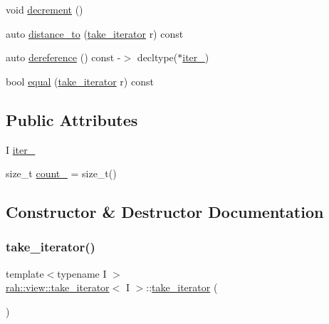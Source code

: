 \begin{DoxyCompactItemize}
\item 
void \mbox{\hyperlink{structrah_1_1view_1_1take__iterator_a8f956fdfee282abbd88100533033d648}{decrement}} ()
\item 
auto \mbox{\hyperlink{structrah_1_1view_1_1take__iterator_a6516d99883863b621df6717bf1d4613b}{distance\+\_\+to}} (\mbox{\hyperlink{structrah_1_1view_1_1take__iterator}{take\+\_\+iterator}} r) const
\item 
auto \mbox{\hyperlink{structrah_1_1view_1_1take__iterator_af6fe7bae848e71f68dcdf12565db2c52}{dereference}} () const -\/$>$ decltype($\ast$\mbox{\hyperlink{structrah_1_1view_1_1take__iterator_abbc947797abfa6ecaeb91c8185212152}{iter\+\_\+}})
\item 
bool \mbox{\hyperlink{structrah_1_1view_1_1take__iterator_a222e31de32a4780e1f0f0f6d9d963ded}{equal}} (\mbox{\hyperlink{structrah_1_1view_1_1take__iterator}{take\+\_\+iterator}} r) const
\end{DoxyCompactItemize}
\subsection*{Public Attributes}
\begin{DoxyCompactItemize}
\item 
I \mbox{\hyperlink{structrah_1_1view_1_1take__iterator_abbc947797abfa6ecaeb91c8185212152}{iter\+\_\+}}
\item 
size\+\_\+t \mbox{\hyperlink{structrah_1_1view_1_1take__iterator_a7d7c6fd1c6eed6192f1f51da04d5ede1}{count\+\_\+}} = size\+\_\+t()
\end{DoxyCompactItemize}


\subsection{Constructor \& Destructor Documentation}
\mbox{\label{structrah_1_1view_1_1take__iterator_a0df2b333ea2a0deb3db7c84d12ebbaca}} 
\subsubsection{\texorpdfstring{take\_iterator()}{take\_iterator()}\hspace{0.1cm}{\footnotesize\ttfamily [1/4]}}
{\footnotesize\ttfamily template$<$typename I $>$ \\
\mbox{\hyperlink{structrah_1_1view_1_1take__iterator}{rah\+::view\+::take\+\_\+iterator}}$<$ I $>$\+::\mbox{\hyperlink{structrah_1_1view_1_1take__iterator}{take\+\_\+iterator}} (\begin{DoxyParamCaption}{ }\end{DoxyParamCaption})\hspace{0.3cm}{\ttfamily [default]}}

